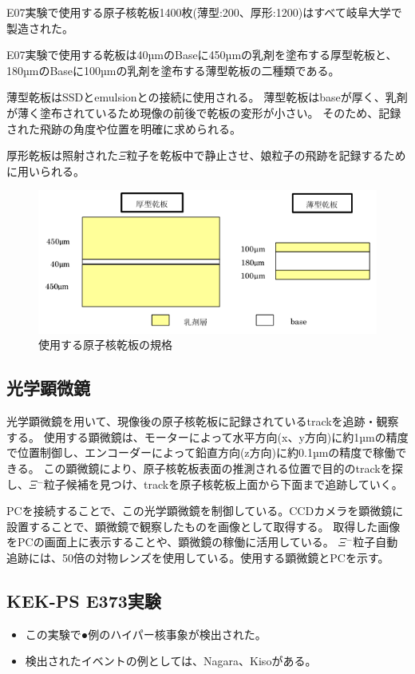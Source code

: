 \documentclass[12pt,a4paper]{jarticle}
\begin{document}
E07実験で使用する原子核乾板1400枚(薄型:200、厚形:1200)はすべて岐阜大学で製造された。
\par
E07実験で使用する乾板は40µmのBaseに450µmの乳剤を塗布する厚型乾板と、180µmのBaseに100µmの乳剤を塗布する薄型乾板の二種類である。
\par
薄型乾板はSSDとemulsionとの接続に使用される。
薄型乾板はbaseが厚く、乳剤が薄く塗布されているため現像の前後で乾板の変形が小さい。
そのため、記録された飛跡の角度や位置を明確に求められる。
\par
厚形乾板は照射された$\Xi$粒子を乾板中で静止させ、娘粒子の飛跡を記録するために用いられる。
\par
\begin{figure}[htbp]
    \begin{center}
     \includegraphics[width=140mm]{emulsionorder.png}
    \end{center}
    \caption{使用する原子核乾板の規格\label{fig:emulsionorder}}
\end{figure}
\subsection{光学顕微鏡}
光学顕微鏡を用いて、現像後の原子核乾板に記録されているtrackを追跡・観察する。
使用する顕微鏡は、モーターによって水平方向(x、y方向)に約1µmの精度で位置制御し、エンコーダーによって鉛直方向(z方向)に約0.1µmの精度で稼働できる。
この顕微鏡により、原子核乾板表面の推測される位置で目的のtrackを探し、$\Xi$$^-$粒子候補を見つけ、trackを原子核乾板上面から下面まで追跡していく。
\par
PCを接続することで、この光学顕微鏡を制御している。CCDカメラを顕微鏡に設置することで、顕微鏡で観察したものを画像として取得する。
取得した画像をPCの画面上に表示することや、顕微鏡の稼働に活用している。
$\Xi$$^-$粒子自動追跡には、50倍の対物レンズを使用している。使用する顕微鏡とPCを示す。
\subsection{KEK-PS E373実験}
\begin{itemize}
    \item この実験で●例のハイパー核事象が検出された。
    \item 検出されたイベントの例としては、Nagara、Kisoがある。
\end{itemize}
\end{document}
